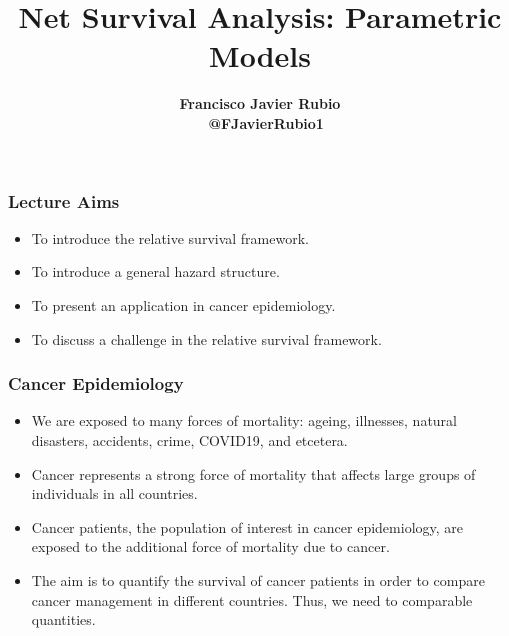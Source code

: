 \documentclass[10pt,handout,compress]{beamer}
\title[]{Net Survival Analysis: Parametric Models}
\author[]{ \textbf{Francisco Javier Rubio \\
\faTwitter \,\,\, @FJavierRubio1}}
\date{}
\begin{document}
\begin{frame}
  \titlepage
\end{frame}


\begin{frame}
\frametitle{Lecture Aims}
\begin{itemize}
\item To introduce the relative survival framework.
\item To introduce a general hazard structure.
\item To present an application in cancer epidemiology.
\item To discuss a challenge in the relative survival framework.
\end{itemize}
\end{frame}

\begin{frame}
\frametitle{Cancer Epidemiology}
\begin{itemize}
\item We are exposed to many forces of mortality: ageing, illnesses, natural disasters, accidents, crime, COVID19, and etcetera. 
\pause
\item Cancer represents a strong force of mortality that affects large groups of individuals in all countries.
\pause 
\item Cancer patients, the population of interest in cancer epidemiology, are exposed to the additional force of mortality due to cancer. 
\pause
\item The aim is to quantify the survival of cancer patients in order to compare cancer management in different countries. \pause Thus, we need to comparable quantities.
\end{itemize}
\end{frame}

%

%
\end{document}
